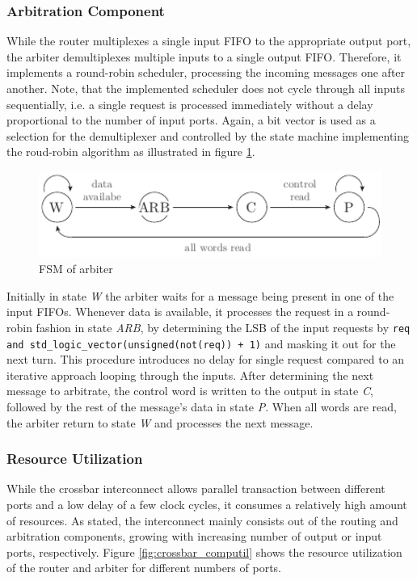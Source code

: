 \subsubsection{Arbitration Component}
While the router multiplexes a single input \ac{FIFO} to the appropriate
output port, the arbiter demultiplexes multiple inputs to a single output
\ac{FIFO}. Therefore, it implements a round-robin scheduler, processing the
incoming messages one after another. Note, that the implemented scheduler does
not cycle through all inputs sequentially, i.e. a single request is processed
immediately without a delay proportional to the number of input ports. Again,
a bit vector is used as a selection for the demultiplexer and controlled by
the state machine implementing the roud-robin algorithm as illustrated in
figure \ref{fig:arbiter_fsm}.
\begin{figure}[tb]
	\centering
	\includegraphics[width=12cm]{../figures/arbiter_fsm}
	\caption{\acs{FSM} of arbiter}
	\label{fig:arbiter_fsm}
\end{figure}
Initially in state \emph{W} the arbiter waits for a message being present in
one of the input \acp{FIFO}. Whenever data is available, it processes the
request in a round-robin fashion in state \emph{ARB}, by determining the
\ac{LSB} of the input requests by
\lstinline{req and std_logic_vector(unsigned(not(req)) + 1)} and masking it
out for the next turn. This procedure introduces no delay for single request
compared to an iterative approach looping through the inputs. After
determining the next message to arbitrate, the control word is written to the
output in state \emph{C}, followed by the rest of the message's data in state
\emph{P}. When all words are read, the arbiter return to state \emph{W} and
processes the next message.

\subsubsection{Resource Utilization}
While the crossbar interconnect allows parallel transaction between different
ports and a low delay of a few clock cycles, it consumes a relatively high
amount of resources. As stated, the interconnect mainly consists out of the
routing and arbitration components, growing with increasing number of output
or input ports, respectively. Figure \ref{fig:crossbar_computil} shows the
resource utilization of the router and arbiter for different numbers of ports.

